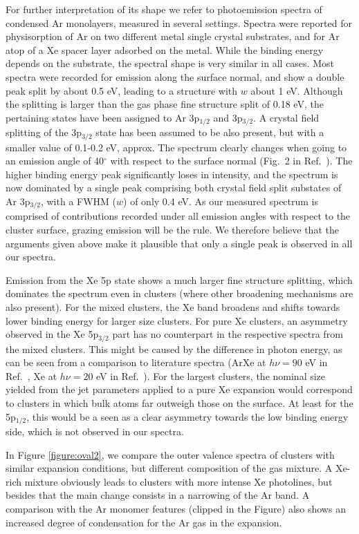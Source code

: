 For further interpretation of its shape we refer to photoemission spectra of condensed Ar monolayers, measured in several settings.\cite{jacobi,jacobi2}
Spectra were reported for physisorption of Ar on two different metal single crystal substrates, and for Ar atop of a Xe spacer layer adsorbed on the metal.
While the binding energy depends on the substrate, the spectral shape is very similar in all cases. 
Most spectra were recorded for emission along the surface normal, and show a double peak split by about 0.5 eV, leading to a structure with $w$ about 1 eV.
Although the splitting is larger than the gas phase fine structure split of 0.18 eV, the pertaining states have been assigned to Ar 3p$_{1/2}$ and 3p$_{3/2}$.
A crystal field splitting of the 3p$_{3/2}$ state has been assumed to be also present, but with a smaller value of 0.1-0.2 eV, approx.\cite{jacobi2} 
The spectrum clearly changes when going to an emission angle of 40$^\circ$ with respect to the surface normal (Fig.\ 2 in Ref.\ \cite{jacobi2}).
The higher binding energy peak significantly loses in intensity, and the spectrum is now dominated by a single peak comprising both crystal field split substates of Ar 3p$_{3/2}$, with a FWHM ($w$) of only 0.4 eV.
As our measured spectrum is comprised of contributions recorded under all emission angles with respect to the cluster surface, grazing emission will be the rule.
We therefore believe that the arguments given above make it plausible that only a single peak is observed in all our spectra.

Emission from the Xe 5p state shows a much larger fine structure splitting, which dominates the spectrum even in clusters (where other broadening mechanisms are also present). 
For the mixed clusters, the Xe band broadens and shifts towards lower binding energy for larger size clusters. 
For pure Xe clusters, an asymmetry observed in the Xe 5p$_{3/2}$ part has no counterpart in the respective spectra from the mixed clusters.
This might be caused by the difference in photon energy, as can be seen from a comparison to literature spectra (ArXe at $h\nu = 90$ eV in Ref.\ \cite{lindblad}, Xe at $h\nu = 20$ eV in Ref.\ \cite{rolles}).
For the largest clusters, the nominal size yielded from the jet parameters applied to a pure Xe expansion would correspond to clusters in which bulk atoms far outweigh those on the surface.
At least for the 5p$_{1/2}$, this would be a seen as a clear asymmetry towards the low binding energy side, which is not observed in our spectra.

In Figure \ref{figure:oval2}, we compare the outer valence spectra of clusters with similar expansion conditions, but different composition of the gas mixture.
A Xe-rich mixture obviously leads to clusters with more intense Xe photolines, but besides that the main change consists in a narrowing of the Ar band.
A comparison with the Ar monomer features (clipped in the Figure) also shows an increased degree of condensation for the Ar gas in the expansion.

